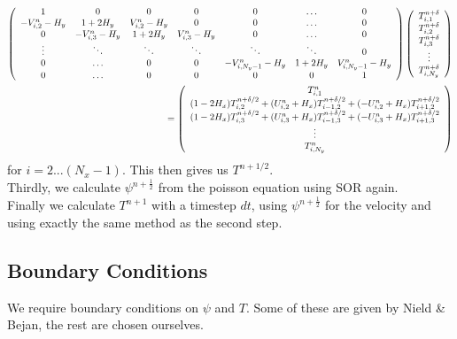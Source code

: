 \documentclass{article}
\begin{document}
\begin{eqnarray}
\left( \begin{array}{c c c c c c c}
1				&0					&0				&0				&0					&\hdots				&0	\\	
- V^{n}_{i,2} - H_y 	& 1+2 H_y				& V^{n}_{i,2} - H_y 	& 0 				& 0 					& \hdots 				& 0	\\
0				&- V^{n}_{i,3} - H_y 		& 1+2 H_y			& V^{n}_{i,3} - H_y 	& 0 					&\hdots  				& 0	\\
\vdots 			& \ddots 				& \ddots 			& \ddots 			& \ddots 				& \ddots 				& 0\\		
0 				& \hdots 				&0	 			& 0				& - V^{n}_{i,N_y-1} - H_y 	& 1+2 H_y  				& V^{n}_{i,N_y-1} - H_y	\\
0 				& \hdots 				&0	 			& 0				& 0 					& 0					& 1  
\end{array} \right) 
\left( \begin{array}{c}
T^{n+\delta}_{i,1}  \\
T^{n+\delta}_{i,2} \\
T^{n+\delta}_{i,3}  \\
\vdots \\
T^{n+\delta}_{i, N_y} \end{array} \right) 
\\ =
\left( \begin{array}{c}
 T^n_{i,1} \\
(1-2 H_x) T^{n+\delta/2}_{i,2} + (U^n_{i,2} + H_x) T^{n+ \delta/2}_{i-1, 2} + (-U^n_{i,2} + H_x) T^{n+ \delta/2}_{i+1, 2}\\
(1-2 H_x) T^{n+\delta/2}_{i,3} + (U^n_{i,3} + H_x) T^{n+ \delta/2}_{i-1, 3} + (-U^n_{i,3} + H_x) T^{n+ \delta/2}_{i+1, 3}\\
\vdots \\
T^n_{i, N_y} \end{array} \right) 
\end{eqnarray}
for $i=2...(N_x-1)$. This then gives us $T^{n+1/2}$. \\
Thirdly, we calculate $\psi^{n+\frac{1}{2}}$ from the poisson equation using SOR again.\\
Finally we calculate $T^{n+1}$ with a timestep $dt$, using $\psi^{n+\frac{1}{2}}$ for the velocity and using exactly the same method as the second step.

\subsection{Boundary Conditions}
We require boundary conditions on $\psi$ and $T$. Some of these are given by Nield \& Bejan, the rest are chosen ourselves. 
\end{document}
